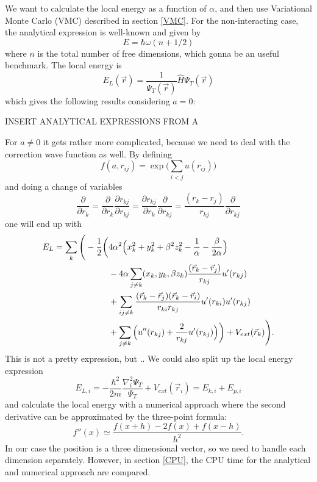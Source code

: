 \documentclass[norsk,a4paper,12pt]{article}
\begin{document}
We want to calculate the local energy as a function of $\alpha$, and then use Variational Monte Carlo (VMC) described in section \ref{VMC}. For the non-interacting case, the analytical expression is well-known and given by
\begin{equation}
E = \hbar\omega(n + 1/2)
\end{equation}
where $n$ is the total number of free dimensions, which gonna be an useful benchmark. The local energy is
\begin{equation}
E_L(\vec{r})=\frac{1}{\Psi_T(\vec{r})}\hat{H}\Psi_T(\vec{r})
\end{equation}
which gives the following results considering $a=0$:

INSERT ANALYTICAL EXPRESSIONS FROM A

For $a\neq0$ it gets rather more complicated, because we need to deal with the correction wave function as well. By defining
\begin{equation}
f(a, r_{ij})=\exp{\bigg(\sum_{i<j}u(r_{ij})\bigg)}
\end{equation}
and doing a change of variables
\begin{equation}
\frac{\partial}{\partial r_k}=\frac{\partial}{\partial r_k}\frac{\partial r_{kj}}{\partial r_{kj}}=\frac{\partial r_{kj}}{\partial r_k}\frac{\partial}{\partial r_{kj}}=\frac{(r_k-r_j)}{r_{kj}}\frac{\partial}{\partial r_{kj}}
\end{equation}
one will end up with
\begin{align}
E_L=\sum_k\Bigg(-\frac{1}{2}\bigg(&4\alpha^2\Big(x_k^2+y_k^2+\beta^2z_k^2-\frac{1}{\alpha}-\frac{\beta}{2\alpha}\Big)\notag\\
&-4\alpha\sum_{j\neq k}(x_k, y_k, \beta z_k)\frac{(\vec{r}_k-\vec{r}_j)}{r_{kj}}u'(r_{kj})\\
&+\sum_{ij\neq k}\frac{(\vec{r}_k-\vec{r}_j)(\vec{r}_k-\vec{r}_i)}{r_{ki}r_{kj}}u'(r_{ki})u'(r_{kj})\notag\\
&+\sum_{j\neq k}\Big(u''(r_{kj})+\frac{2}{r_{kj}}u'(r_{kj})\Big)\bigg)+V_{ext}(\vec{r}_k)\Bigg).\notag
\end{align}
This is not a pretty expression, but .. We could also split up the local energy expression 
\begin{equation}
E_{L,i}=-\frac{\hbar^2}{2m}\frac{\nabla_i^2\Psi_T}{\Psi_T}+V_{ext}(\vec{r}_i)=E_{k,i}+E_{p,i}
\end{equation}
and calculate the local energy with a numerical approach where the second derivative can be approximated by the three-point formula:
\begin{equation}
f''(x)\simeq\frac{f(x+h)-2f(x)+f(x-h)}{h^2}.
\end{equation}
In our case the position is a three dimensional vector, so we need to handle each dimension separately. However, in section \ref{CPU}, the CPU time for the analytical and numerical approach are compared. 
\end{document}
